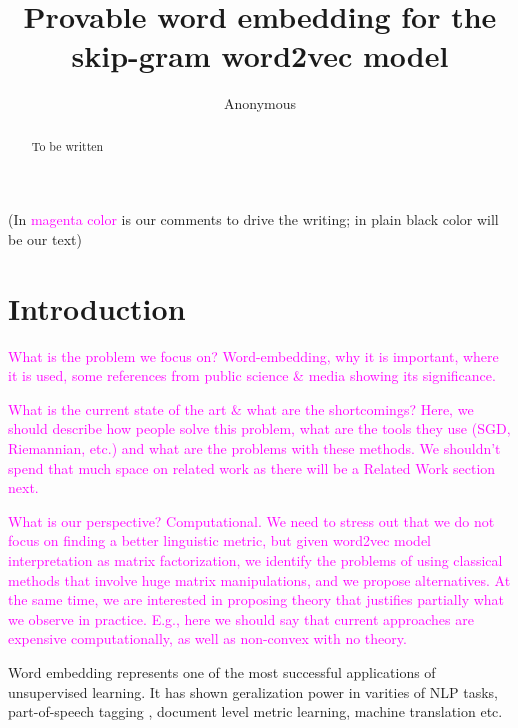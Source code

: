 \documentclass[letterpaper]{article} %
\begin{document}
%

\title{Provable word embedding for the skip-gram word2vec model}

\author{Anonymous}

\maketitle

\begin{abstract}
To be written
\end{abstract}

(In \textcolor{magenta}{magenta color} is our comments to drive the writing; in plain black color will be our text)

\section{Introduction}
\textcolor{magenta}{What is the problem we focus on? Word-embedding, why it is important, where it is used, some references from public science \& media showing its significance.}

\textcolor{magenta}{What is the current state of the art \& what are the shortcomings? Here, we should describe how people solve this problem, what are the tools they use (SGD, Riemannian, etc.) and what are the problems with these methods. We shouldn't spend that much space on related work as there will be a Related Work section next.}

\textcolor{magenta}{What is our perspective? Computational. We need to stress out that we do not focus on finding a better linguistic metric, but given word2vec model interpretation as matrix factorization, we identify the problems of using classical methods that involve huge matrix manipulations, and we propose alternatives. At the same time, we are interested in proposing theory that justifies partially what we observe in practice. E.g., here we should say that current approaches are expensive computationally, as well as non-convex with no theory.}

Word embedding represents one of the most successful applications of unsupervised learning. It has shown geralization power in varities of NLP tasks, part-of-speech tagging \cite{abka2016evaluating}, document level metric learning\cite{kusner2015word}, machine translation \cite{NIPS2013_5021} etc.
\end{document}
